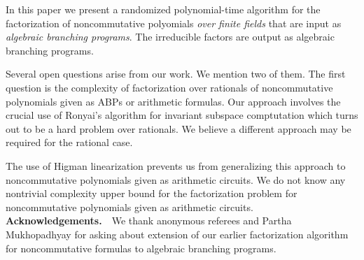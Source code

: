 \documentclass[sloppy,oribibl,envcountsame,envcountsect,11pt]{article}
\begin{document}
In this paper we present a randomized polynomial-time algorithm for
the factorization of noncommutative polyomials \emph{over finite
  fields} that are input as \emph{algebraic branching programs}. The
irreducible factors are output as algebraic branching programs.

Several open questions arise from our work. We mention two of them.
The first question is the complexity of factorization over rationals
of noncommutative polynomials given as ABPs or arithmetic formulas. Our
approach involves the crucial use of Ronyai's algorithm for invariant
subspace comptutation which turns out to be a hard problem over
rationals.  We believe a different approach may be required for the
rational case.

The use of Higman linearization prevents us from generalizing this
approach to noncommutative polynomials given as arithmetic
circuits. We do not know any nontrivial complexity upper bound for the
factorization problem for noncommutative polynomials given as
arithmetic circuits.\\

\noindent\textbf{Acknowledgements.}~~We thank anonymous referees
and Partha Mukhopadhyay for asking about extension of our earlier
factorization algorithm for noncommutative formulas to algebraic
branching programs.


%



\appendix

\newpage

\end{document}
